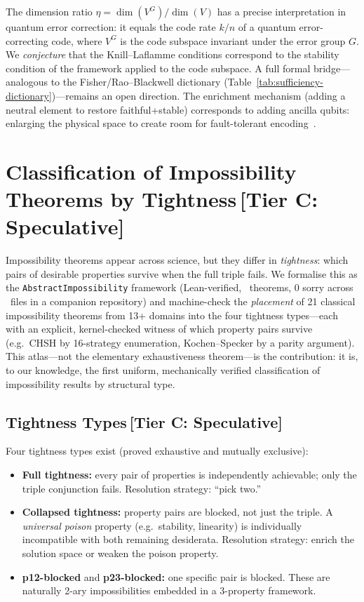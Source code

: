 \documentclass[11pt,a4paper]{article}
\begin{document}
The dimension ratio $\eta = \dim(V^G)/\dim(V)$ has a precise interpretation in quantum error correction: it equals the code rate $k/n$ of a quantum error-correcting code, where $V^G$ is the code subspace invariant under the error group $G$.  We \emph{conjecture} that the Knill--Laflamme conditions correspond to the stability condition of the framework applied to the code subspace.  A full formal bridge---analogous to the Fisher/Rao--Blackwell dictionary (Table~\ref{tab:sufficiency-dictionary})---remains an open direction.  The enrichment mechanism (adding a neutral element to restore faithful+stable) corresponds to adding ancilla qubits: enlarging the physical space to create room for fault-tolerant encoding~\citep{knill1997theory}.

\section{Classification of Impossibility Theorems by Tightness\,\textnormal{\normalsize[Tier C: Speculative]}}
\label{sec:classification}

Impossibility theorems appear across science, but they differ in \emph{tightness}: which pairs of desirable properties survive when the full triple fails.  We formalise this as the \texttt{AbstractImpossibility} framework (Lean-verified, \ClaimOstrowskiTheorems~theorems, 0 sorry across \ClaimOstrowskiFiles~files in a companion repository) and machine-check the \emph{placement} of 21 classical impossibility theorems from 13+ domains into the four tightness types---each with an explicit, kernel-checked witness of which property pairs survive (e.g.\ CHSH by 16-strategy enumeration, Kochen--Specker by a parity argument). This atlas---not the elementary exhaustiveness theorem---is the contribution: it is, to our knowledge, the first uniform, mechanically verified classification of impossibility results by structural type.

\subsection{Tightness Types\,\textnormal{\normalsize[Tier C: Speculative]}}

Four tightness types exist (proved exhaustive and mutually exclusive):
\begin{itemize}
  \item \textbf{Full tightness:} every pair of properties is independently achievable; only the triple conjunction fails.  Resolution strategy: ``pick two.''
  \item \textbf{Collapsed tightness:} property pairs are blocked, not just the triple.  A \emph{universal poison} property (e.g.\ stability, linearity) is individually incompatible with both remaining desiderata.  Resolution strategy: enrich the solution space or weaken the poison property.
  \item \textbf{p12-blocked} and \textbf{p23-blocked:} one specific pair is blocked.  These are naturally 2-ary impossibilities embedded in a 3-property framework.
\end{itemize}
\end{document}
